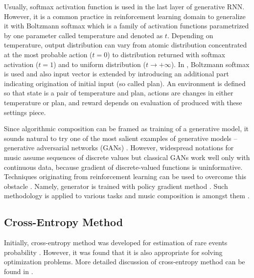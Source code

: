 \documentclass{article}
\begin{document}
Usually, softmax activation function is used in the last layer of generative RNN. However, it is a common practice in reinforcement learning domain to generalize it with Boltzmann softmax which is a family of activation functions parametrized by one parameter called temperature and denoted as $t$. Depending on temperature, output distribution can vary from atomic distribution concentrated at the most probable action ($t = 0$) to distribution returned with softmax activation ($t = 1$) and to uniform distribution ($t \to +\infty$). In \cite{kumar2019polyphonic}, Boltzmann softmax is used and also input vector is extended by introducing an additional part indicating origination of initial input (so called plan). An environment is defined so that state is a pair of temperature and plan, actions are changes in either temperature or plan, and reward depends on evaluation of produced with these settings piece.

Since algorithmic composition can be framed as training of a generative model, it sounds natural to try one of the most salient examples of generative models -- generative adversarial networks (GANs) \cite{goodfellow2014gan}. However, widespread notations for music assume sequences of discrete values but classical GANs work well only with continuous data, because gradient of discrete-valued functions is uninformative. Techniques originating from reinforcement learning can be used to overcome this obstacle \cite{yu2016seqgan,hjelm2017boundary}. Namely, generator is trained with policy gradient method \cite{williams1992simple}. Such methodology is applied to various tasks and music composition is amongst them \cite{limaguimaraes2017objective}.

\subsection{Cross-Entropy Method}
\label{subsec:crossentropy}

Initially, cross-entropy method was developed for estimation of rare events probability \cite{rubinstein1997optimization}. However, it was found that it is also appropriate for solving optimization problems. More detailed discussion of cross-entropy method can be found in \cite{boer2005tutorial}.
\end{document}
